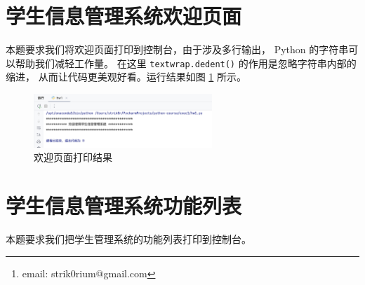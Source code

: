 \documentclass[openany, 10pt]{ctexart}
\title{\thetitle}
\author{Strik0r
\thanks{email: strik0rium@gmail.com}}
\begin{document}


\newpage
{\small \setlength{\parskip}{0em} \tableofcontents}

\section{学生信息管理系统欢迎页面}

本题要求我们将欢迎页面打印到控制台，由于涉及多行输出，
Python 的字符串可以帮助我们减轻工作量。
在这里 \lstinline`textwrap.dedent()` 的作用是忽略字符串内部的缩进，
从而让代码更美观好看。运行结果如图 \ref{fig:欢迎页面打印结果} 所示。


\begin{figure}[H]
    \centering \small
    \includegraphics[width=0.6\textwidth]{pic/hw1-result/截屏2025-07-05 11.49.12}
    \caption{欢迎页面打印结果}
    \label{fig:欢迎页面打印结果}
\end{figure}

\section{学生信息管理系统功能列表}

本题要求我们把学生管理系统的功能列表打印到控制台。

\end{document}
